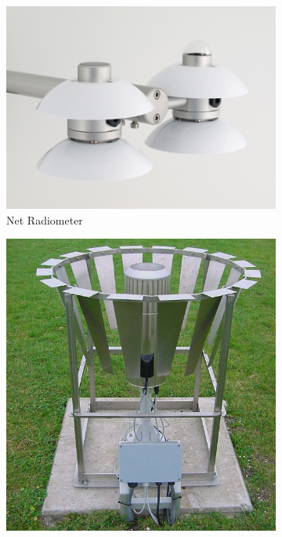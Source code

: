 \documentclass[a4paper,11pt]{kth-mag}
\begin{document}
\begin{figure}
    \centering
    \begin{subfigure}[t]{0.4\textwidth}
        \centering
        \includegraphics[width=\textwidth]{images/net_radiometer}
        \caption{Net Radiometer}
        \label{fig:net_radiometer}
    \end{subfigure}
    \hfill
    \begin{subfigure}[t]{0.28\textwidth}
        \centering
        \includegraphics[width=\textwidth]{images/rain_gauge_shield}

\end{subfigure}
\end{figure}
\end{document}
